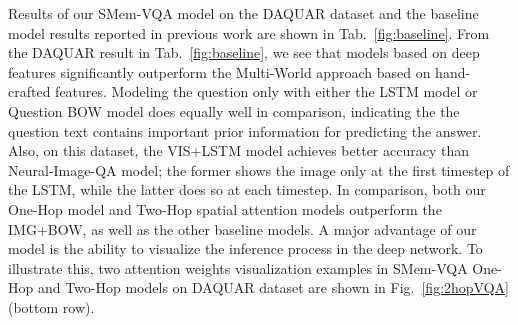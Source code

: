 Results of our SMem-VQA model on the DAQUAR dataset and the baseline model results reported in previous work are shown in Tab.~\ref{fig:baseline}. 
From the DAQUAR result in Tab.~\ref{fig:baseline}, we see that models based on deep features significantly outperform the Multi-World approach based on hand-crafted features. Modeling the question only with either the LSTM model or Question BOW model does equally well in comparison, indicating the the question text contains important prior information for predicting the answer. Also, on this dataset, the VIS+LSTM model achieves better accuracy than Neural-Image-QA model; the former shows the image only at the first timestep of the LSTM, while the latter does so at each timestep. In comparison, both our One-Hop model and Two-Hop spatial attention models outperform the IMG+BOW, as well as the other baseline models.
A major advantage of our model is the ability to visualize the inference process in the deep network. To illustrate this, two attention weights visualization examples in SMem-VQA One-Hop and Two-Hop models on DAQUAR dataset are shown in Fig.~\ref{fig:2hopVQA} (bottom row).




